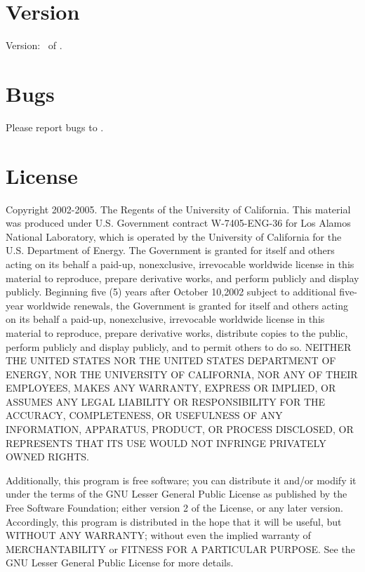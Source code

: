 \documentclass[english]{article}
\begin{document}
\section{Version}
Version: \Version\ of \Date.

\section{Bugs}
Please report bugs to .

\section{License}

Copyright 2002-2005.  The Regents of the University of
California. This material was produced under U.S. Government contract
W-7405-ENG-36 for Los Alamos National Laboratory, which is operated by
the University of California for the U.S. Department of Energy. The
Government is granted for itself and others acting on its behalf a
paid-up, nonexclusive, irrevocable worldwide license in this material
to reproduce, prepare derivative works, and perform publicly and
display publicly. Beginning five (5) years after October 10,2002
subject to additional five-year worldwide renewals, the Government is
granted for itself and others acting on its behalf a paid-up,
nonexclusive, irrevocable worldwide license in this material to
reproduce, prepare derivative works, distribute copies to the public,
perform publicly and display publicly, and to permit others to do
so. NEITHER THE UNITED STATES NOR THE UNITED STATES DEPARTMENT OF
ENERGY, NOR THE UNIVERSITY OF CALIFORNIA, NOR ANY OF THEIR EMPLOYEES,
MAKES ANY WARRANTY, EXPRESS OR IMPLIED, OR ASSUMES ANY LEGAL LIABILITY
OR RESPONSIBILITY FOR THE ACCURACY, COMPLETENESS, OR USEFULNESS OF ANY
INFORMATION, APPARATUS, PRODUCT, OR PROCESS DISCLOSED, OR REPRESENTS
THAT ITS USE WOULD NOT INFRINGE PRIVATELY OWNED RIGHTS.

Additionally, this program is free software; you can distribute it
and/or modify it under the terms of the GNU Lesser General Public
License as published by the Free Software Foundation; either version 2
of the License, or any later version.  Accordingly, this program is
distributed in the hope that it will be useful, but WITHOUT ANY
WARRANTY; without even the implied warranty of MERCHANTABILITY or
FITNESS FOR A PARTICULAR PURPOSE.  See the GNU Lesser General Public
License for more details.
\end{document}
